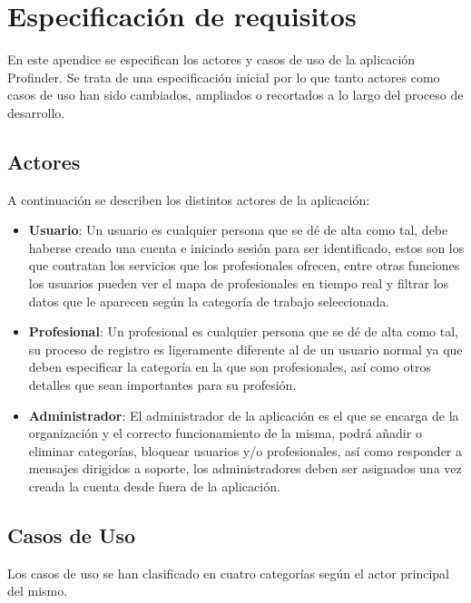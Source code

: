 \chapter{Especificación de requisitos}
\label{Appendix:srs}

En este apendice se especifican los actores y casos de uso de la aplicación Profinder. Se trata de una especificación inicial por lo que tanto actores como casos de uso han sido cambiados, ampliados o recortados a lo largo del proceso de desarrollo.

\section{Actores}
A continuación se describen los distintos actores de la aplicación:
\begin{itemize}
    \item \textbf{Usuario}: Un usuario es cualquier persona que se dé de alta como tal, debe haberse creado una cuenta e iniciado sesión para ser identificado, estos son los que contratan los servicios que los profesionales ofrecen, entre otras funciones los usuarios pueden ver el mapa de profesionales en tiempo real y filtrar los datos que le aparecen según la categoría de trabajo seleccionada.
    \item \textbf{Profesional}: Un profesional es cualquier persona que se dé de alta como tal, su proceso de registro es ligeramente diferente al de un usuario normal ya que deben especificar la categoría en la que son profesionales, así como otros detalles que sean importantes para su profesión.
    \item \textbf{Administrador}: El administrador de la aplicación es el que se encarga de la organización y el correcto funcionamiento de la misma, podrá añadir o eliminar categorías, bloquear usuarios y/o profesionales, así como responder a mensajes dirigidos a soporte, los administradores deben ser asignados una vez creada la cuenta desde fuera de la aplicación.
\end{itemize}
\section{Casos de Uso}
Los casos de uso se han clasificado en cuatro categorías según el actor principal del mismo.
\newpage
